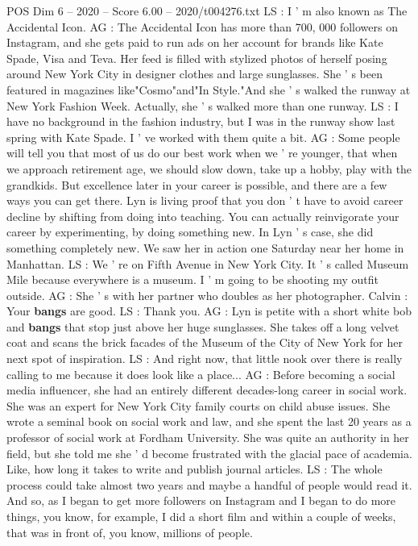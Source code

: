 \begin{textsample}{POS Dim 6 – 2020 – Score 6.00 – 2020/t004276.txt}
LS : I ' m also known as The Accidental Icon.
AG : The Accidental Icon has more than 700, 000 followers on Instagram, and she gets paid to run ads on her account for brands like Kate Spade, Visa and Teva.
Her feed is filled with stylized photos of herself posing around New York City in designer clothes and large sunglasses.
She ' s been featured in magazines like"Cosmo"and"In Style."And she ' s walked the runway at New York Fashion Week.
Actually, she ' s walked more than one runway.
LS : I have no background in the fashion industry, but I was in the runway show last spring with Kate Spade.
I ' ve worked with them quite a bit.
AG : Some people will tell you that most of us do our best work when we ' re younger, that when we approach retirement age, we should slow down, take up a hobby, play with the grandkids.
But excellence later in your career is possible, and there are a few ways you can get there.
Lyn is living proof that you don ' t have to avoid career decline by shifting from doing into teaching.
You can actually reinvigorate your career by experimenting, by doing something new.
In Lyn ' s case, she did something completely new.
We saw her in action one Saturday near her home in Manhattan.
LS : We ' re on Fifth Avenue in New York City.
It ' s called Museum Mile because everywhere is a museum.
I ' m going to be shooting my outfit outside.
AG : She ' s with her partner who doubles as her photographer.
Calvin : Your \textbf{bangs} are good.
LS : Thank you.
AG : Lyn is petite with a short white bob and \textbf{bangs} that stop just above her huge sunglasses.
She takes off a long velvet coat and scans the brick facades of the Museum of the City of New York for her next spot of inspiration.
LS : And right now, that little nook over there is really calling to me because it does look like a place...
AG : Before becoming a social media influencer, she had an entirely different decades-long career in social work.
She was an expert for New York City family courts on child abuse issues.
She wrote a seminal book on social work and law, and she spent the last 20 years as a professor of social work at Fordham University.
She was quite an authority in her field, but she told me she ' d become frustrated with the glacial pace of academia.
Like, how long it takes to write and publish journal articles.
LS : The whole process could take almost two years and maybe a handful of people would read it.
And so, as I began to get more followers on Instagram and I began to do more things, you know, for example, I did a short film and within a couple of weeks, that was in front of, you know, millions of people.

\end{textsample}
